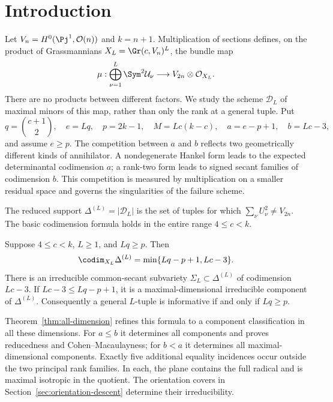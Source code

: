 \section{Introduction}
\label{sec:introduction}
Let $V_n=H^0(\Pj^1,\mathcal O(n))$ and $k=n+1$. Multiplication
of sections defines, on the product of Grassmannians
$X_L=\Gr(c,V_n)^L$, the bundle map
\begin{equation}\label{eq:intro-multiplication}
 \mu:\bigoplus_{\nu=1}^L\Sym^2\mathcal U_\nu
           \longrightarrow V_{2n}\otimes\mathcal O_{X_L}.
\end{equation}
There are no products between different factors. We study the scheme
$\mathscr D_L$ of maximal minors of this map, rather than only the
rank at a general tuple. Put
\[
 q=\binom{c+1}{2},\quad e=Lq,\quad p=2k-1,\quad
 M=Lc(k-c),\quad a=e-p+1,\quad b=Lc-3,
\]
and assume $e\ge p$. The competition between $a$ and $b$ reflects
two geometrically different kinds of annihilator. A nondegenerate
Hankel form leads to the expected determinantal codimension $a$;
a rank-two form leads to signed secant families of codimension $b$.
This competition is measured by multiplication on a smaller residual
space and governs the singularities of the failure scheme.

The reduced support $\Delta^{(L)}=|\mathscr D_L|$ is the set of
tuples for which $\sum_\nu U_\nu^2\ne V_{2n}$. The basic
codimension formula holds in the entire range $4\le c<k$.
\begin{theorem}\label{thm:global-intro}
Suppose $4\le c<k$, $L\ge1$, and $Lq\ge p$. Then
\begin{equation}\label{eq:codimension}
 \codim_{X_L}\Delta^{(L)}=\min\{Lq-p+1,Lc-3\}.
\end{equation}
There is an irreducible common-secant subvariety $\Sigma_L\subset\Delta^{(L)}$ of codimension $Lc-3$. If $Lc-3\le Lq-p+1$, it is a maximal-dimensional irreducible component of $\Delta^{(L)}$. Consequently a general $L$-tuple is informative if and only if $Lq\ge p$.
\end{theorem}

Theorem~\ref{thm:all-dimension} refines this formula to a component
classification in all these dimensions. For $a\le b$ it determines
all components and proves reducedness and Cohen--Macaulayness; for
$b<a$ it determines all maximal-dimensional components. Exactly five
additional equality incidences occur outside the two principal rank
families. In each, the plane contains the full radical and is maximal
isotropic in the quotient. The orientation covers in
Section~\ref{sec:orientation-descent} determine their irreducibility.

